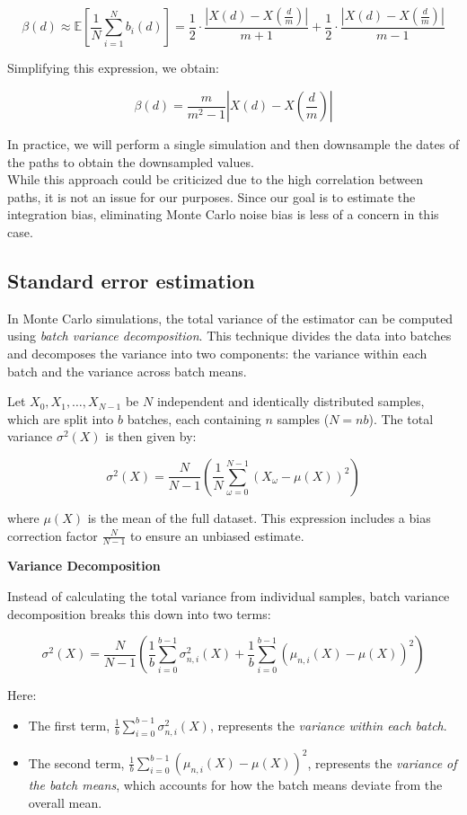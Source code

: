 \documentclass{article}
\begin{document}
\[
\beta(d) \approx \mathbb{E}\left[\frac{1}{N} \sum_{i=1}^N b_i(d)\right] = \frac{1}{2} \cdot \frac{|X(d) - X\left(\frac{d}{m}\right)|}{m+1} + \frac{1}{2} \cdot \frac{|X(d) - X\left(\frac{d}{m}\right)|}{m-1}
\]

Simplifying this expression, we obtain:

\[
\beta(d) = \frac{m}{m^2 - 1} \left| X(d) - X\left(\frac{d}{m}\right) \right|
\]

In practice, we will perform a single simulation and then downsample the dates of the paths to obtain the downsampled values. \\ While this approach could be criticized due to the high correlation between paths, it is not an issue for our purposes. Since our goal is to estimate the integration bias, eliminating Monte Carlo noise bias is less of a concern in this case.

\subsection{Standard error estimation}

In Monte Carlo simulations, the total variance of the estimator can be computed using \textit{batch variance decomposition}. This technique divides the data into batches and decomposes the variance into two components: the variance within each batch and the variance across batch means.

Let $X_0, X_1, \dots, X_{N-1}$ be $N$ independent and identically distributed samples, which are split into $b$ batches, each containing $n$ samples ($N = nb$). The total variance $\sigma^2(X)$ is then given by:

\[
\sigma^2(X) = \frac{N}{N-1} \left( \frac{1}{N} \sum_{\omega=0}^{N-1} (X_\omega - \mu(X))^2 \right)
\]

where $\mu(X)$ is the mean of the full dataset. This expression includes a bias correction factor $\frac{N}{N-1}$ to ensure an unbiased estimate.

\textbf{Variance Decomposition}

Instead of calculating the total variance from individual samples, batch variance decomposition breaks this down into two terms:

\[
\sigma^2(X) = \frac{N}{N-1} \left( \frac{1}{b} \sum_{i=0}^{b-1} \sigma^2_{n,i}(X) + \frac{1}{b} \sum_{i=0}^{b-1} \left( \mu_{n,i}(X) - \mu(X) \right)^2 \right)
\]

Here:

\begin{itemize}
\item The first term, $\frac{1}{b} \sum_{i=0}^{b-1} \sigma^2_{n,i}(X)$, represents the \textit{variance within each batch}.
\item The second term, $\frac{1}{b} \sum_{i=0}^{b-1} \left( \mu_{n,i}(X) - \mu(X) \right)^2$, represents the \textit{variance of the batch means}, which accounts for how the batch means deviate from the overall mean.
\end{itemize}
\end{document}
